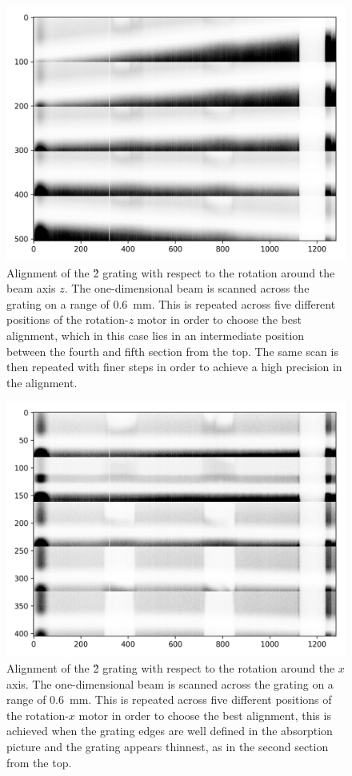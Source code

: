 \begin{figure}[ht]
    \centering
    \includegraphics[width=\textwidth]{gfx/alignment-rot-z.png}
    \caption{Alignment of the \G2 grating with respect to the rotation
        around
    the beam axis $z$. The one-dimensional beam is scanned across the
    grating on a range of \SI{0.6}{\milli\metre}. This is repeated across
five different positions of the rotation-$z$ motor in order to choose the
best alignment, which in this case lies in an intermediate position between
the fourth and fifth section from the top. The same scan is then repeated
with finer steps in order to achieve a high precision in the alignment.}
    \label{fig:alignment-z}
\end{figure}

\begin{figure}[ht]
    \centering
    \includegraphics[width=\textwidth]{gfx/alignment-rot-x.png}
    \caption{Alignment of the \G2 grating with respect to the rotation
    around the $x$ axis. The one-dimensional beam is scanned across the
    grating on a range of \SI{0.6}{\milli\metre}. This is repeated across
five different positions of the rotation-$x$ motor in order to choose the
best alignment, this is achieved when the grating edges are well defined in
the absorption picture and the grating appears thinnest, as in the second
section from the top.}
    \label{fig:alignment-x}
\end{figure}

